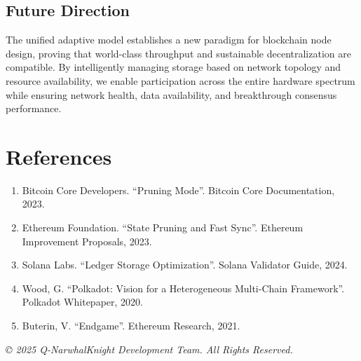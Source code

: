\documentclass[11pt,a4paper]{article}
\begin{document}
\subsection{Future Direction}

The unified adaptive model establishes a new paradigm for blockchain node design, proving that world-class throughput and sustainable decentralization are compatible. By intelligently managing storage based on network topology and resource availability, we enable participation across the entire hardware spectrum while ensuring network health, data availability, and breakthrough consensus performance.

\section*{References}

\begin{enumerate}
\item Bitcoin Core Developers. ``Pruning Mode''. Bitcoin Core Documentation, 2023.
\item Ethereum Foundation. ``State Pruning and Fast Sync''. Ethereum Improvement Proposals, 2023.
\item Solana Labs. ``Ledger Storage Optimization''. Solana Validator Guide, 2024.
\item Wood, G. ``Polkadot: Vision for a Heterogeneous Multi-Chain Framework''. Polkadot Whitepaper, 2020.
\item Buterin, V. ``Endgame''. Ethereum Research, 2021.
\end{enumerate}

\vspace{2em}

\noindent\textit{© 2025 Q-NarwhalKnight Development Team. All Rights Reserved.}
\end{document}
